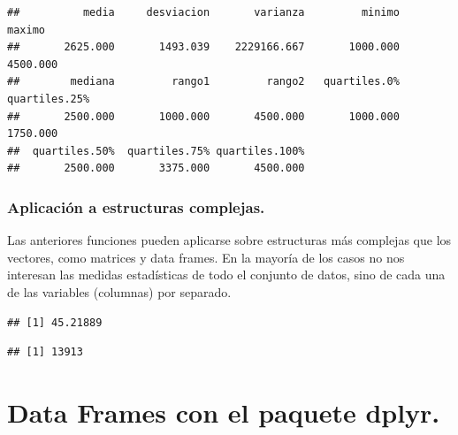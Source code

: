 \documentclass[
  12pt,
]{book}
\newenvironment{Shaded}{\begin{snugshade}}{\end{snugshade}}
\newcommand{\FunctionTok}[1]{\textcolor[rgb]{0.00,0.00,0.00}{#1}}
\newcommand{\NormalTok}[1]{#1}
\newcommand{\SpecialCharTok}[1]{\textcolor[rgb]{0.00,0.00,0.00}{#1}}
\begin{document}
\begin{verbatim}
##          media     desviacion       varianza         minimo         maximo 
##       2625.000       1493.039    2229166.667       1000.000       4500.000 
##        mediana         rango1         rango2   quartiles.0%  quartiles.25% 
##       2500.000       1000.000       4500.000       1000.000       1750.000 
##  quartiles.50%  quartiles.75% quartiles.100% 
##       2500.000       3375.000       4500.000
\end{verbatim}

\hypertarget{aplicaciuxf3n-a-estructuras-complejas.}{%
\subsection{\texorpdfstring{\textbf{Aplicación a estructuras complejas}.}{Aplicación a estructuras complejas.}}\label{aplicaciuxf3n-a-estructuras-complejas.}}

Las anteriores funciones pueden aplicarse sobre estructuras más complejas que
los vectores, como matrices y data frames. En la mayoría de los casos no nos interesan las medidas estadísticas de todo el conjunto de datos, sino de cada una de las variables (columnas) por separado.

\begin{Shaded}
\end{Shaded}

\begin{verbatim}
## [1] 45.21889
\end{verbatim}

\begin{Shaded}
\end{Shaded}

\begin{verbatim}
## [1] 13913
\end{verbatim}

\hypertarget{data-frames-con-el-paquete-dplyr.}{%
\chapter{\texorpdfstring{\textbf{Data Frames con el paquete dplyr.}}{Data Frames con el paquete dplyr.}}\label{data-frames-con-el-paquete-dplyr.}}
\end{document}
